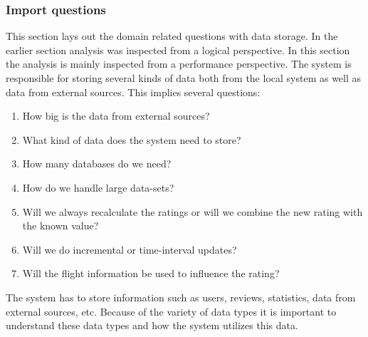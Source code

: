 \subsubsection{Import questions}
This section lays out the domain related questions with data storage. In the earlier section analysis was inspected from a logical perspective. In this section the analysis is mainly inspected from a performance perspective. 
The system is responsible for storing several kinds of data both from the local system as well as data from external sources. This implies several questions:
\begin{enumerate}
\item How big is the data from external sources?
\item What kind of data does the system need to store?
\item How many databases do we need?
\item How do we handle large data-sets?
\item Will we always recalculate the ratings or will we combine the new rating with the known value?  
\item Will we do incremental or time-interval updates?
\item Will the flight information be used to influence the rating?
\end{enumerate}
The system has to store information such as users, reviews, statistics, data from external sources, etc. Because of the variety of data types it is important to understand these data types and how the system utilizes this data.

